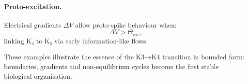 \paragraph{Proto-excitation.}
Electrical gradients $\Delta V$ allow proto-spike behaviour when:
\[
\Delta V > \Theta_{\mathrm{exc}},
\]
linking K₄ to K₅ via early information-like flows.

These examples illustrate the essence of the K3→K4 transition in bounded
form: boundaries, gradients and non-equilibrium cycles become the first
stable biological organisation.

